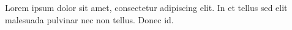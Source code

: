 Lorem ipsum dolor sit amet, consectetur adipiscing elit. In et tellus sed elit malesuada pulvinar nec non tellus. Donec id.